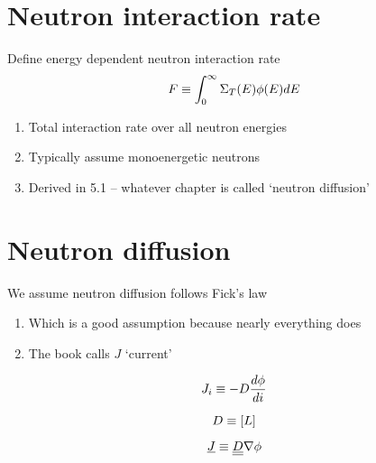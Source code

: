 \documentclass[aspectratio=1610,pdftex,dvipsnames,compress,xcolor={dvipsnames}]{beamer}
\begin{document}
\section{Neutron interaction rate}


\addtocounter{framenumber}{-1} 
\begin{frame}{Define energy dependent neutron interaction rate}
    \begin{equation}
        \LARGE
        F \equiv \int^\infty_0 \Sigma_T(E) \phi(E) dE
    \end{equation}

    \vspace*{\fill}

    \begin{enumerate}[series=outerlist,topsep=0pt,itemsep=21pt,leftmargin=*,label=(\arabic*)]
        \item[]Total interaction rate over all neutron energies
        \item[]Typically assume monoenergetic neutrons
        \item[]Derived in 5.1 -- whatever chapter is called `neutron diffusion'
    \end{enumerate}
\end{frame}


\section{Neutron diffusion}


\addtocounter{framenumber}{-1} 
\begin{frame}{We assume neutron diffusion follows Fick's law}
    \begin{enumerate}[series=outerlist,topsep=0pt,itemsep=21pt,leftmargin=*,label=(\arabic*)]
        \item[]Which is a good assumption because nearly everything does
        \item[]The book calls $J$ `current' 
    \end{enumerate}

    \vspace*{\fill}

    \begin{equation}
        \LARGE
        J_i \equiv -D \frac{d \phi}{di}
    \end{equation}

    \begin{equation}
        \LARGE
        D \equiv [L]
    \end{equation}

    \begin{equation}
        \LARGE
        \underline{J} \equiv \underline{\underline{D}} \nabla \phi
    \end{equation}
\end{frame}
\end{document}

